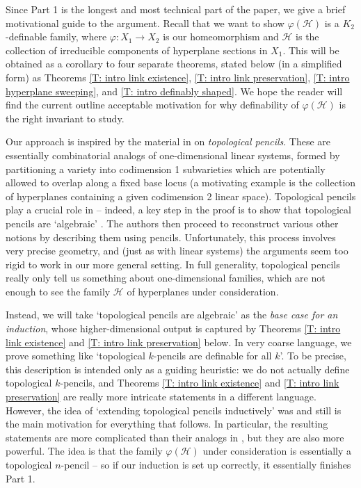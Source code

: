 \documentclass{amsart}
\theoremstyle{definition}
\begin{document}
Since Part 1 is the longest and most technical part of the paper, we give a brief motivational guide to the argument. Recall that we want to show $\varphi(\mathcal H)$ is a $K_2$-definable family, where $\varphi:X_1\rightarrow X_2$ is our homeomorphism and $\mathcal H$ is the collection of irreducible components of hyperplane sections in $X_1$. This will be obtained as a corollary to four separate theorems, stated below (in a simplified form) as Theorems \ref{T: intro link existence}, \ref{T: intro link preservation}, \ref{T: intro hyperplane sweeping}, and \ref{T: intro definably shaped}. We hope the reader will find the current outline acceptable motivation for why definability of $\varphi(\mathcal H)$ is the right invariant to study.

Our approach is inspired by the material in \cite[Section 7.3]{KLOS} on \textit{topological pencils}. These are essentially combinatorial analogs of one-dimensional linear systems, formed by partitioning a variety into codimension 1 subvarieties which are potentially allowed to overlap along a fixed base locus (a motivating example is the collection of hyperplanes containing a given codimension 2 linear space). Topological pencils play a crucial role in \cite{KLOS} -- indeed, a key step in the proof is to show that topological pencils are `algebraic' \cite[Corollary 7.3.5]{KLOS}. The authors then proceed to reconstruct various other notions by describing them using pencils. Unfortunately, this process involves very precise geometry, and (just as with linear systems) the arguments seem too rigid to work in our more general setting. In full generality, topological pencils really only tell us something about one-dimensional families, which are not enough to see the family $\mathcal H$ of hyperplanes under consideration.

Instead, we will take `topological pencils are algebraic' as the \textit{base case for an induction}, whose higher-dimensional output is captured by Theorems \ref{T: intro link existence} and \ref{T: intro link preservation} below. In very coarse language, we prove something like `topological $k$-pencils are definable for all $k$'. To be precise, this description is intended only as a guiding heuristic: we do not actually define topological $k$-pencils, and Theorems \ref{T: intro link existence} and \ref{T: intro link preservation} are really more intricate statements in a different language. However, the idea of `extending topological pencils inductively' was and still is the main motivation for everything that follows. In particular, the resulting statements are more complicated than their analogs in \cite{KLOS}, but they are also more powerful. The idea is that the family $\varphi(\mathcal H)$ under consideration is essentially a topological $n$-pencil -- so if our induction is set up correctly, it essentially finishes Part 1. 
\end{document}
